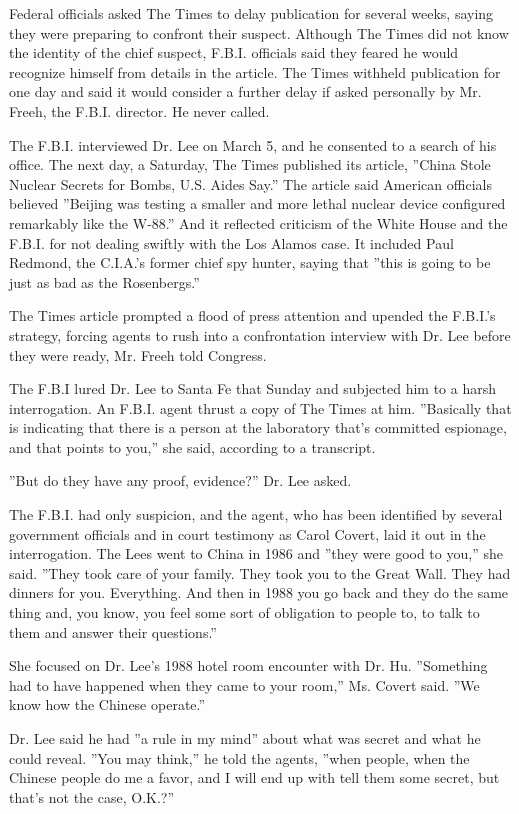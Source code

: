 Federal officials asked The Times to delay publication for several
weeks, saying they were preparing to confront their suspect. Although
The Times did not know the identity of the chief suspect, F.B.I.
officials said they feared he would recognize himself from details in
the article. The Times withheld publication for one day and said it
would consider a further delay if asked personally by Mr. Freeh, the
F.B.I. director. He never called.

The F.B.I. interviewed Dr. Lee on March 5, and he consented to a search
of his office. The next day, a Saturday, The Times published its
article, ''China Stole Nuclear Secrets for Bombs, U.S. Aides Say.'' The
article said American officials believed ''Beijing was testing a smaller
and more lethal nuclear device configured remarkably like the W-88.''
And it reflected criticism of the White House and the F.B.I. for not
dealing swiftly with the Los Alamos case. It included Paul Redmond, the
C.I.A.'s former chief spy hunter, saying that ''this is going to be just
as bad as the Rosenbergs.''

The Times article prompted a flood of press attention and upended the
F.B.I.'s strategy, forcing agents to rush into a confrontation interview
with Dr. Lee before they were ready, Mr. Freeh told Congress.

The F.B.I lured Dr. Lee to Santa Fe that Sunday and subjected him to a
harsh interrogation. An F.B.I. agent thrust a copy of The Times at him.
''Basically that is indicating that there is a person at the laboratory
that's committed espionage, and that points to you,'' she said,
according to a transcript.

''But do they have any proof, evidence?'' Dr. Lee asked.

The F.B.I. had only suspicion, and the agent, who has been identified by
several government officials and in court testimony as Carol Covert,
laid it out in the interrogation. The Lees went to China in 1986 and
''they were good to you,'' she said. ''They took care of your family.
They took you to the Great Wall. They had dinners for you. Everything.
And then in 1988 you go back and they do the same thing and, you know,
you feel some sort of obligation to people to, to talk to them and
answer their questions.''

She focused on Dr. Lee's 1988 hotel room encounter with Dr. Hu.
''Something had to have happened when they came to your room,'' Ms.
Covert said. ''We know how the Chinese operate.''

Dr. Lee said he had ''a rule in my mind'' about what was secret and what
he could reveal. ''You may think,'' he told the agents, ''when people,
when the Chinese people do me a favor, and I will end up with tell them
some secret, but that's not the case, O.K.?''

